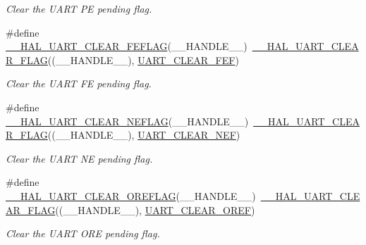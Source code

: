 \begin{DoxyCompactItemize}
\begin{DoxyCompactList}\small\item\em Clear the U\+A\+RT PE pending flag. \end{DoxyCompactList}\item 
\#define \mbox{\hyperlink{group___u_a_r_t___exported___macros_gae1dfc7777b089a10464841045b524caa}{\+\_\+\+\_\+\+H\+A\+L\+\_\+\+U\+A\+R\+T\+\_\+\+C\+L\+E\+A\+R\+\_\+\+F\+E\+F\+L\+AG}}(\+\_\+\+\_\+\+H\+A\+N\+D\+L\+E\+\_\+\+\_\+)~\mbox{\hyperlink{group___u_a_r_t___exported___macros_ga9bd035161d41cde4f2568c7af06493bf}{\+\_\+\+\_\+\+H\+A\+L\+\_\+\+U\+A\+R\+T\+\_\+\+C\+L\+E\+A\+R\+\_\+\+F\+L\+AG}}((\+\_\+\+\_\+\+H\+A\+N\+D\+L\+E\+\_\+\+\_\+), \mbox{\hyperlink{group___u_a_r_t___i_t___c_l_e_a_r___flags_ga2040edf7a1daa2e9f352364e285ef5c3}{U\+A\+R\+T\+\_\+\+C\+L\+E\+A\+R\+\_\+\+F\+EF}})
\begin{DoxyCompactList}\small\item\em Clear the U\+A\+RT FE pending flag. \end{DoxyCompactList}\item 
\#define \mbox{\hyperlink{group___u_a_r_t___exported___macros_gaa1f69421585b3ada4d2b81d502a3ae6b}{\+\_\+\+\_\+\+H\+A\+L\+\_\+\+U\+A\+R\+T\+\_\+\+C\+L\+E\+A\+R\+\_\+\+N\+E\+F\+L\+AG}}(\+\_\+\+\_\+\+H\+A\+N\+D\+L\+E\+\_\+\+\_\+)~\mbox{\hyperlink{group___u_a_r_t___exported___macros_ga9bd035161d41cde4f2568c7af06493bf}{\+\_\+\+\_\+\+H\+A\+L\+\_\+\+U\+A\+R\+T\+\_\+\+C\+L\+E\+A\+R\+\_\+\+F\+L\+AG}}((\+\_\+\+\_\+\+H\+A\+N\+D\+L\+E\+\_\+\+\_\+), \mbox{\hyperlink{group___u_a_r_t___i_t___c_l_e_a_r___flags_gad5b9aafb495296d917a5d85e63383396}{U\+A\+R\+T\+\_\+\+C\+L\+E\+A\+R\+\_\+\+N\+EF}})
\begin{DoxyCompactList}\small\item\em Clear the U\+A\+RT NE pending flag. \end{DoxyCompactList}\item 
\#define \mbox{\hyperlink{group___u_a_r_t___exported___macros_ga9cdc2f2d55eaaa7895996bf6848df42e}{\+\_\+\+\_\+\+H\+A\+L\+\_\+\+U\+A\+R\+T\+\_\+\+C\+L\+E\+A\+R\+\_\+\+O\+R\+E\+F\+L\+AG}}(\+\_\+\+\_\+\+H\+A\+N\+D\+L\+E\+\_\+\+\_\+)~\mbox{\hyperlink{group___u_a_r_t___exported___macros_ga9bd035161d41cde4f2568c7af06493bf}{\+\_\+\+\_\+\+H\+A\+L\+\_\+\+U\+A\+R\+T\+\_\+\+C\+L\+E\+A\+R\+\_\+\+F\+L\+AG}}((\+\_\+\+\_\+\+H\+A\+N\+D\+L\+E\+\_\+\+\_\+), \mbox{\hyperlink{group___u_a_r_t___i_t___c_l_e_a_r___flags_ga3bc97b70293f9a7bf8cc21a74094afad}{U\+A\+R\+T\+\_\+\+C\+L\+E\+A\+R\+\_\+\+O\+R\+EF}})
\begin{DoxyCompactList}\small\item\em Clear the U\+A\+RT O\+RE pending flag. \end{DoxyCompactList}\item 

\end{DoxyCompactItemize}
